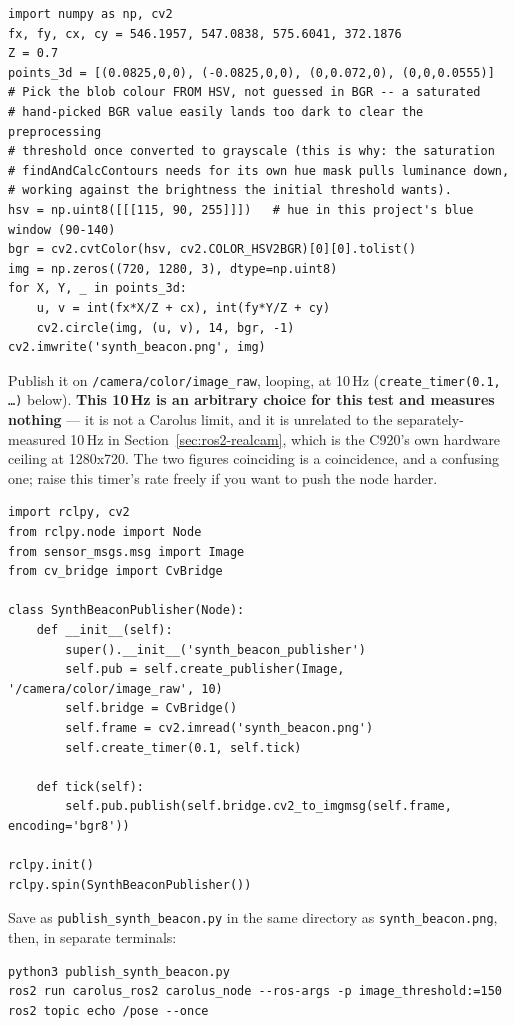 \documentclass[11pt]{report}
\begin{document}
\begin{lstlisting}[style=code]
import numpy as np, cv2
fx, fy, cx, cy = 546.1957, 547.0838, 575.6041, 372.1876
Z = 0.7
points_3d = [(0.0825,0,0), (-0.0825,0,0), (0,0.072,0), (0,0,0.0555)]
# Pick the blob colour FROM HSV, not guessed in BGR -- a saturated
# hand-picked BGR value easily lands too dark to clear the preprocessing
# threshold once converted to grayscale (this is why: the saturation
# findAndCalcContours needs for its own hue mask pulls luminance down,
# working against the brightness the initial threshold wants).
hsv = np.uint8([[[115, 90, 255]]])   # hue in this project's blue window (90-140)
bgr = cv2.cvtColor(hsv, cv2.COLOR_HSV2BGR)[0][0].tolist()
img = np.zeros((720, 1280, 3), dtype=np.uint8)
for X, Y, _ in points_3d:
    u, v = int(fx*X/Z + cx), int(fy*Y/Z + cy)
    cv2.circle(img, (u, v), 14, bgr, -1)
cv2.imwrite('synth_beacon.png', img)
\end{lstlisting}

Publish it on \texttt{/camera/color/image\_raw}, looping, at 10\,Hz
(\texttt{create\_timer(0.1, \ldots)} below). \textbf{This 10\,Hz is an
arbitrary choice for this test and measures nothing} --- it is not a
Carolus limit, and it is unrelated to the separately-measured 10\,Hz in
Section~\ref{sec:ros2-realcam}, which is the C920's own hardware ceiling at
1280x720. The two figures coinciding is a coincidence, and a confusing one;
raise this timer's rate freely if you want to push the node harder.

\begin{lstlisting}[style=code]
import rclpy, cv2
from rclpy.node import Node
from sensor_msgs.msg import Image
from cv_bridge import CvBridge

class SynthBeaconPublisher(Node):
    def __init__(self):
        super().__init__('synth_beacon_publisher')
        self.pub = self.create_publisher(Image, '/camera/color/image_raw', 10)
        self.bridge = CvBridge()
        self.frame = cv2.imread('synth_beacon.png')
        self.create_timer(0.1, self.tick)

    def tick(self):
        self.pub.publish(self.bridge.cv2_to_imgmsg(self.frame, encoding='bgr8'))

rclpy.init()
rclpy.spin(SynthBeaconPublisher())
\end{lstlisting}

Save as \texttt{publish\_synth\_beacon.py} in the same directory as
\texttt{synth\_beacon.png}, then, in separate terminals:

\begin{lstlisting}[style=shell]
python3 publish_synth_beacon.py
ros2 run carolus_ros2 carolus_node --ros-args -p image_threshold:=150
ros2 topic echo /pose --once
\end{lstlisting}
\end{document}
